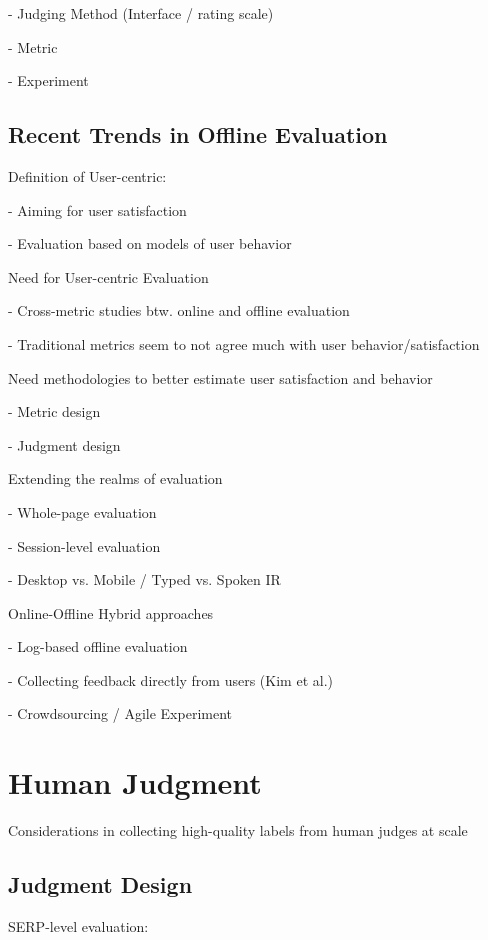 \documentclass[openany]{now} %
\newcommand{\newpar}{\bigskip\noindent}
\begin{document}
-	Judging Method (Interface / rating scale) 

-	Metric

-	Experiment

\section{Recent Trends in Offline Evaluation}



Definition of User-centric:

- Aiming for user satisfaction 

- Evaluation based on models of user behavior

\newpar
Need for User-centric Evaluation

- Cross-metric studies btw. online and offline evaluation \cite{radl:comp10}

- Traditional metrics seem to not agree much with user behavior/satisfaction
 \cite{Al-Maskari2007} 

\newpar
Need methodologies to better estimate user satisfaction and behavior

-	Metric design

-	Judgment design


\newpar
Extending the realms of evaluation

-	Whole-page evaluation

-	Session-level evaluation

-	Desktop vs. Mobile / Typed vs. Spoken IR

\newpar
Online-Offline Hybrid approaches

- Log-based offline evaluation \cite{Li:2015} \cite{li2010contextual}

- Collecting feedback directly from users (Kim et al.)

- Crowdsourcing / Agile Experiment

\chapter{Human Judgment}
Considerations in collecting high-quality labels from human judges at scale

\section{Judgment Design}

SERP-level evaluation: 
\end{document}
